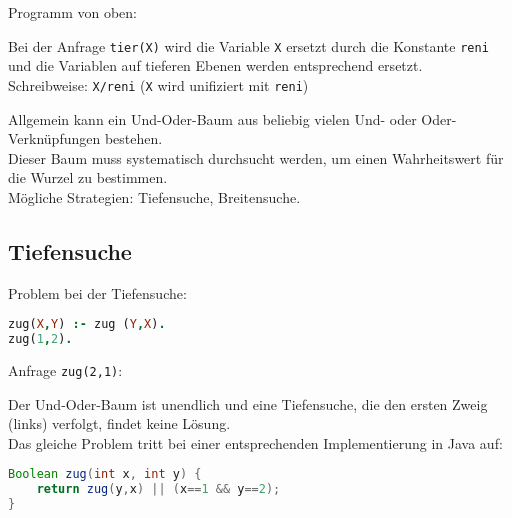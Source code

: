  Programm von oben:
\begin{center}
\end{center}
Bei der Anfrage \lstinline$tier(X)$ wird die Variable \lstinline$X$ ersetzt durch die Konstante \lstinline$reni$ und die Variablen auf tieferen Ebenen werden entsprechend ersetzt.\\
Schreibweise: \lstinline$X/reni$ (\lstinline$X$ wird unifiziert mit \lstinline$reni$)
\begin{center}
\end{center}
Allgemein kann ein Und-Oder-Baum aus beliebig vielen Und- oder Oder-Verknüpfungen bestehen.\\
Dieser Baum muss systematisch durchsucht werden, um einen Wahrheitswert für die Wurzel zu bestimmen.\\
Mögliche Strategien: Tiefensuche, Breitensuche.
\subsection{Tiefensuche}
Problem bei der Tiefensuche:
 $ $
\begin{lstlisting}[language=Prolog]
zug(X,Y) :- zug (Y,X).
zug(1,2).
\end{lstlisting}
Anfrage \lstinline$zug(2,1)$:
\begin{center}
\end{center}
Der Und-Oder-Baum ist unendlich und eine Tiefensuche, die den ersten Zweig (links) verfolgt, findet keine Lösung.\\
Das gleiche Problem tritt bei einer entsprechenden Implementierung in Java auf:
\begin{lstlisting}[language=Java]
Boolean zug(int x, int y) {
	return zug(y,x) || (x==1 && y==2);
}
\end{lstlisting}
